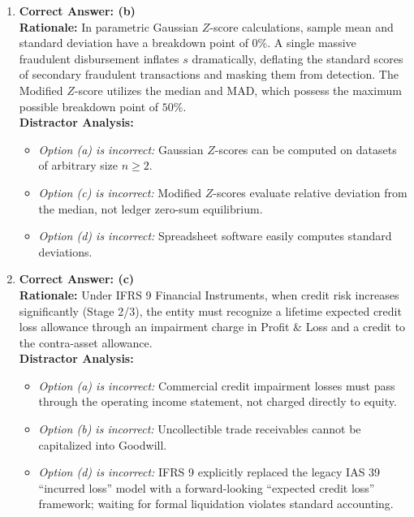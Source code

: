 \begin{enumerate}[label=\textbf{MCQ 6.\arabic*}]
    \item \textbf{Correct Answer: (b)}\\
    \textbf{Rationale:} In parametric Gaussian $Z$-score calculations, sample mean and standard deviation have a breakdown point of $0\%$. A single massive fraudulent disbursement inflates $s$ dramatically, deflating the standard scores of secondary fraudulent transactions and masking them from detection. The Modified $Z$-score utilizes the median and MAD, which possess the maximum possible breakdown point of $50\%$.\\
    \textbf{Distractor Analysis:}
    \begin{itemize}
        \item \textit{Option (a) is incorrect:} Gaussian $Z$-scores can be computed on datasets of arbitrary size $n \ge 2$.
        \item \textit{Option (c) is incorrect:} Modified $Z$-scores evaluate relative deviation from the median, not ledger zero-sum equilibrium.
        \item \textit{Option (d) is incorrect:} Spreadsheet software easily computes standard deviations.
    \end{itemize}

    \item \textbf{Correct Answer: (c)}\\
    \textbf{Rationale:} Under IFRS 9 Financial Instruments, when credit risk increases significantly (Stage 2/3), the entity must recognize a lifetime expected credit loss allowance through an impairment charge in Profit \& Loss and a credit to the contra-asset allowance.\\
    \textbf{Distractor Analysis:}
    \begin{itemize}
        \item \textit{Option (a) is incorrect:} Commercial credit impairment losses must pass through the operating income statement, not charged directly to equity.
        \item \textit{Option (b) is incorrect:} Uncollectible trade receivables cannot be capitalized into Goodwill.
        \item \textit{Option (d) is incorrect:} IFRS 9 explicitly replaced the legacy IAS 39 ``incurred loss'' model with a forward-looking ``expected credit loss'' framework; waiting for formal liquidation violates standard accounting.
    \end{itemize}
\end{enumerate}

